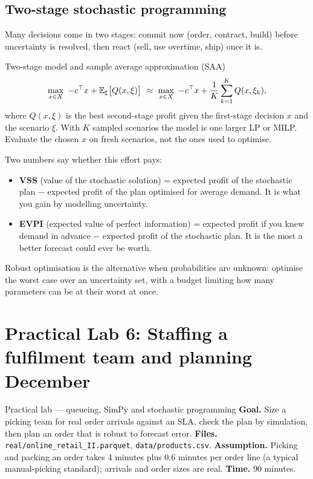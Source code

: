 \subsection{Two-stage stochastic programming}
Many decisions come in two stages: commit now (order, contract, build) before uncertainty is resolved, then react
(sell, use overtime, ship) once it is.
\begin{keyformula}{Two-stage model and sample average approximation (SAA)}
\[ \max_{x\in X}\ -c^\top x+\mathbb{E}_\xi\big[Q(x,\xi)\big]\ \approx\ \max_{x\in X}\ -c^\top x+\frac1K\sum_{k=1}^K Q(x,\xi_k), \]
where $Q(x,\xi)$ is the best second-stage profit given the first-stage decision $x$ and the scenario $\xi$. With $K$
sampled scenarios the model is one larger LP or MILP. Evaluate the chosen $x$ on fresh scenarios, not the ones used to
optimise.
\end{keyformula}

Two numbers say whether this effort pays:
\begin{itemize}[nosep]
\item \textbf{VSS} (value of the stochastic solution) = expected profit of the stochastic plan $-$ expected profit of the
plan optimised for average demand. It is what you gain by modelling uncertainty.
\item \textbf{EVPI} (expected value of perfect information) = expected profit if you knew demand in advance $-$
expected profit of the stochastic plan. It is the most a better forecast could ever be worth.
\end{itemize}
Robust optimisation is the alternative when probabilities are unknown: optimise the worst case over an uncertainty
set, with a budget limiting how many parameters can be at their worst at once.

\section{Practical Lab 6: Staffing a fulfilment team and planning December}
\begin{labbox}{Practical lab --- queueing, SimPy and stochastic programming}
\textbf{Goal.} Size a picking team for real order arrivals against an SLA, check the plan by simulation, then plan
an order that is robust to forecast error. \textbf{Files.} \texttt{real/online\_retail\_II.parquet},
\texttt{data/products.csv}. \textbf{Assumption.} Picking and packing an order takes 4 minutes plus 0.6 minutes per
order line (a typical manual-picking standard); arrivals and order sizes are real. \textbf{Time.} 90 minutes.
\end{labbox}

